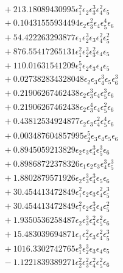 \documentclass[10pt]{article}
\begin{document}
\begin{align*}
&{}  + 213.18089430995 \epsilon_{1}^{2} \epsilon_{2} \epsilon_{3}^{3} \epsilon_{4}^{2} \epsilon_{5} \\
&{}  + 0.10431555934494 \epsilon_{2} \epsilon_{3}^{2} \epsilon_{4} \epsilon_{5}^{4} \epsilon_{6} \\
&{}  + 54.422263293877 \epsilon_{1} \epsilon_{2}^{3} \epsilon_{3} \epsilon_{4}^{2} \epsilon_{5}^{2} \\
&{}  + 876.55417265131 \epsilon_{1}^{2} \epsilon_{2}^{3} \epsilon_{3}^{2} \epsilon_{4} \epsilon_{5} \\
&{}  + 110.01631541209 \epsilon_{1}^{5} \epsilon_{2} \epsilon_{3} \epsilon_{4} \epsilon_{5} \\
&{}  + 0.027382834328048 \epsilon_{2} \epsilon_{3} \epsilon_{4}^{3} \epsilon_{5} \epsilon_{6}^{3} \\
&{}  + 0.21906267462438 \epsilon_{2} \epsilon_{3}^{3} \epsilon_{4} \epsilon_{5}^{3} \epsilon_{6} \\
&{}  + 0.21906267462438 \epsilon_{2} \epsilon_{3}^{4} \epsilon_{4} \epsilon_{5}^{2} \epsilon_{6} \\
&{}  + 0.43812534924877 \epsilon_{2} \epsilon_{3} \epsilon_{4}^{2} \epsilon_{5}^{4} \epsilon_{6} \\
&{}  + 0.003487604857995 \epsilon_{2}^{5} \epsilon_{3} \epsilon_{4} \epsilon_{5} \epsilon_{6} \\
&{}  + 0.8945059213829 \epsilon_{2} \epsilon_{3} \epsilon_{4}^{3} \epsilon_{5}^{3} \epsilon_{6} \\
&{}  + 0.89868722378326 \epsilon_{1} \epsilon_{2} \epsilon_{3} \epsilon_{4}^{3} \epsilon_{5}^{3} \\
&{}  + 1.8802879571926 \epsilon_{2} \epsilon_{3}^{3} \epsilon_{4}^{3} \epsilon_{5} \epsilon_{6} \\
&{}  + 30.454413472849 \epsilon_{1}^{2} \epsilon_{2} \epsilon_{3} \epsilon_{4}^{2} \epsilon_{5}^{3} \\
&{}  + 30.454413472849 \epsilon_{1}^{2} \epsilon_{2} \epsilon_{3}^{3} \epsilon_{4} \epsilon_{5}^{2} \\
&{}  + 1.9350536258487 \epsilon_{2} \epsilon_{3}^{3} \epsilon_{4}^{2} \epsilon_{5}^{2} \epsilon_{6} \\
&{}  + 15.483039694871 \epsilon_{1} \epsilon_{2}^{2} \epsilon_{3} \epsilon_{4}^{2} \epsilon_{5}^{3} \\
&{}  + 1016.3302742765 \epsilon_{1}^{3} \epsilon_{2}^{3} \epsilon_{3} \epsilon_{4} \epsilon_{5} \\
&{}  - 1.1221839389271 \epsilon_{2}^{2} \epsilon_{3}^{2} \epsilon_{4}^{2} \epsilon_{5}^{2} \epsilon_{6} \\

\end{align*}
\end{document}
